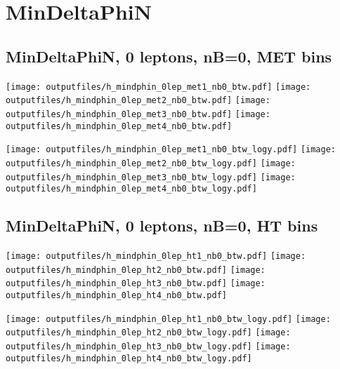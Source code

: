 \documentclass[11pt]{article}
\begin{document}
    \clearpage






    \section{ MinDeltaPhiN }

    \subsection{ MinDeltaPhiN, 0 leptons, nB=0, MET bins }

    \noindent
     \texttt{[image: outputfiles/h\_mindphin\_0lep\_met1\_nb0\_btw.pdf]}
     \texttt{[image: outputfiles/h\_mindphin\_0lep\_met2\_nb0\_btw.pdf]}
     \texttt{[image: outputfiles/h\_mindphin\_0lep\_met3\_nb0\_btw.pdf]}
     \texttt{[image: outputfiles/h\_mindphin\_0lep\_met4\_nb0\_btw.pdf]}

    \noindent
     \texttt{[image: outputfiles/h\_mindphin\_0lep\_met1\_nb0\_btw\_logy.pdf]}
     \texttt{[image: outputfiles/h\_mindphin\_0lep\_met2\_nb0\_btw\_logy.pdf]}
     \texttt{[image: outputfiles/h\_mindphin\_0lep\_met3\_nb0\_btw\_logy.pdf]}
     \texttt{[image: outputfiles/h\_mindphin\_0lep\_met4\_nb0\_btw\_logy.pdf]}

    \clearpage



    \subsection{ MinDeltaPhiN, 0 leptons, nB=0, HT bins }

    \noindent
     \texttt{[image: outputfiles/h\_mindphin\_0lep\_ht1\_nb0\_btw.pdf]}
     \texttt{[image: outputfiles/h\_mindphin\_0lep\_ht2\_nb0\_btw.pdf]}
     \texttt{[image: outputfiles/h\_mindphin\_0lep\_ht3\_nb0\_btw.pdf]}
     \texttt{[image: outputfiles/h\_mindphin\_0lep\_ht4\_nb0\_btw.pdf]}

    \noindent
     \texttt{[image: outputfiles/h\_mindphin\_0lep\_ht1\_nb0\_btw\_logy.pdf]}
     \texttt{[image: outputfiles/h\_mindphin\_0lep\_ht2\_nb0\_btw\_logy.pdf]}
     \texttt{[image: outputfiles/h\_mindphin\_0lep\_ht3\_nb0\_btw\_logy.pdf]}
     \texttt{[image: outputfiles/h\_mindphin\_0lep\_ht4\_nb0\_btw\_logy.pdf]}
\end{document}
